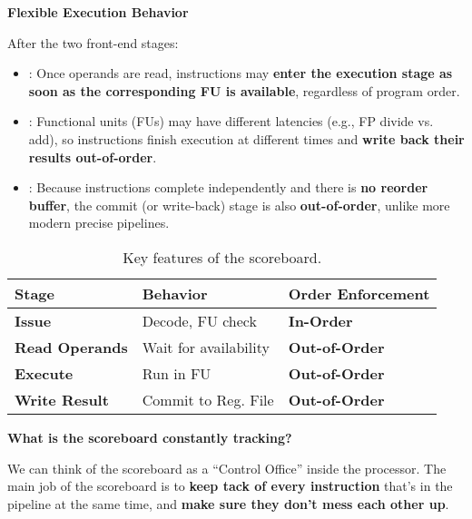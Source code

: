 \highspace
\begin{flushleft}
    \textcolor{Green3}{ \textbf{Flexible Execution Behavior}}
\end{flushleft}
After the two front-end stages:
\begin{itemize}
    \item {}: Once operands are read, instructions may \textbf{enter the execution stage as soon as the corresponding FU is available}, regardless of program order.
    
    \item {}: Functional units (FUs) may have different latencies (e.g., FP divide vs. add), so instructions finish execution at different times and \textbf{write back their results out-of-order}.
    
    \item {}: Because instructions complete independently and there is \textbf{no reorder buffer}, the commit (or write-back) stage is also \textbf{out-of-order}, unlike more modern precise pipelines.
\end{itemize}

\highspace
\begin{table}[!htp]
    \centering
    \begin{tabular}{@{} l | l | l @{}}
        \toprule
        Stage & Behavior & Order Enforcement \\
        \midrule
        \textbf{Issue}          & Decode, FU check      & \textbf{In-Order}     \\ [.3em]
        \textbf{Read Operands}  & Wait for availability & \textbf{Out-of-Order} \\ [.3em]
        \textbf{Execute}        & Run in FU             & \textbf{Out-of-Order} \\ [.3em]
        \textbf{Write Result}   & Commit to Reg. File   & \textbf{Out-of-Order} \\
        \bottomrule
    \end{tabular}
    \caption{Key features of the scoreboard.}
\end{table}

\highspace
\begin{flushleft}
    \textcolor{Green3}{ \textbf{What is the scoreboard constantly tracking?}}
\end{flushleft}
We can think of the scoreboard as a ``Control Office'' inside the processor. The main job of the scoreboard is to \textbf{keep tack of every instruction} that's in the pipeline at the same time, and \textbf{make sure they don't mess each other up}.

